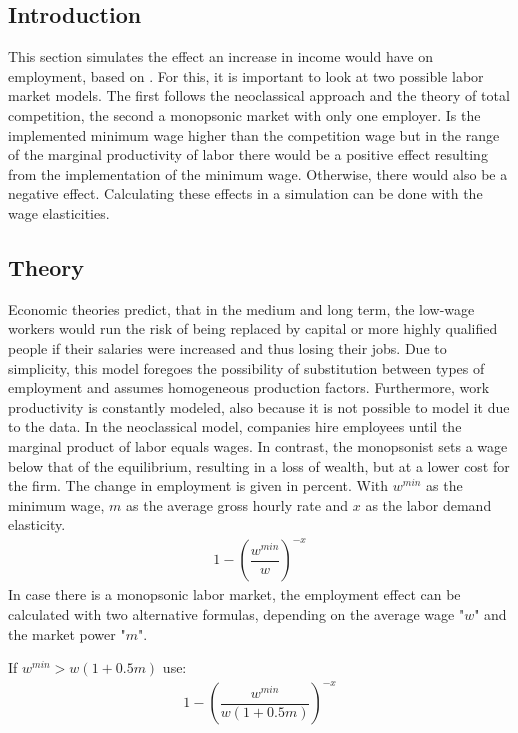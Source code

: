 \documentclass[a4paper]{article}
\begin{document}
\subsection{Introduction}
This section simulates the effect an increase in income would have on employment, based on \cite{boll2015potenzielle}. 
For this, it is important to look at two possible labor market models. The first follows the neoclassical approach and the theory of total competition, the second a monopsonic market with only one employer. Is the implemented minimum wage higher than the competition wage but in the range of the marginal productivity of labor there would be a positive effect resulting from the implementation of the minimum wage. Otherwise, there would also be a negative effect. 
Calculating these effects in a simulation can be done with the wage elasticities.   

\subsection{Theory}
Economic theories predict, that in the medium and long term, the low-wage workers would run the risk of being replaced by capital or more highly qualified people if their salaries were increased and thus losing their jobs. Due to simplicity, this model foregoes the possibility of substitution between types of employment and assumes homogeneous production factors. Furthermore, work productivity is constantly modeled, also because it is not possible to model it due to the data. 
In the neoclassical model, companies hire employees until the marginal product of labor equals wages. In contrast, the monopsonist sets a wage below that of the equilibrium, resulting in a loss of wealth, but at a lower cost for the firm. 
The change in employment is given in percent. With $w^{min}$ as the minimum wage, $m$ as the average gross hourly rate and $x$ as the labor demand elasticity.
\begin{align}
\label{neoclass}
1 - \left(\dfrac{w^{min}}{w}\right)^{-x}
\end{align}
In case there is a monopsonic labor market, the employment effect can be calculated with two alternative formulas, depending on the average wage "$w$" and the market power "$m$".

If $w^{min} > w(1+0.5m)$ use:
\begin{align}
\label{monop}
1 - \left(\dfrac{w^{min}}{w(1+0.5m)}\right)^{-x}
\end{align}
\end{document}
